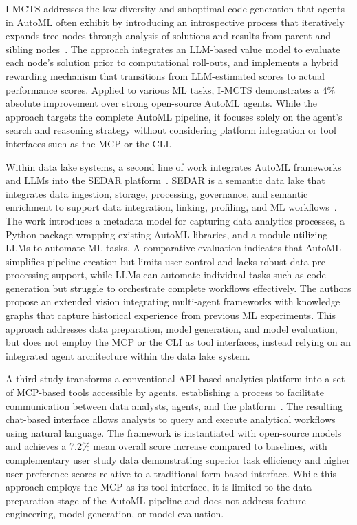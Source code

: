 \documentclass[
english,                 %
bibtex,                  %
includeExtraAbstracts, %
]{kththesis}
\numberwithin{listing}{chapter}
\begin{document}
\gls{I-MCTS} addresses the low-diversity and suboptimal code generation that agents in \gls{AutoML} often exhibit by introducing an introspective process that iteratively expands tree nodes through analysis of solutions and results from parent and sibling nodes~\cite{liang_i-mcts_2026}. The approach integrates an \gls{LLM}-based value model to evaluate each node's solution prior to computational roll-outs, and implements a hybrid rewarding mechanism that transitions from \gls{LLM}-estimated scores to actual performance scores. Applied to various \gls{ML} tasks, \gls{I-MCTS} demonstrates a 4\% absolute improvement over strong open-source \gls{AutoML} agents. While the approach targets the complete \gls{AutoML} pipeline, it focuses solely on the agent's search and reasoning strategy without considering platform integration or tool interfaces such as the \gls{MCP} or the \gls{CLI}.

Within data lake systems, a second line of work integrates \gls{AutoML} frameworks and \glspl{LLM} into the \gls{SEDAR} platform~\cite{hoseini_towards_2025}. \gls{SEDAR} is a semantic data lake that integrates data ingestion, storage, processing, governance, and semantic enrichment to support data integration, linking, profiling, and \gls{ML} workflows~\cite{hoseini_sedar_2023}.  The work introduces a metadata model for capturing data analytics processes, a Python package wrapping existing \gls{AutoML} libraries, and a module utilizing \glspl{LLM} to automate \gls{ML} tasks. A comparative evaluation indicates that \gls{AutoML} simplifies pipeline creation but limits user control and lacks robust data pre-processing support, while \glspl{LLM} can automate individual tasks such as code generation but struggle to orchestrate complete workflows effectively. The authors propose an extended vision integrating multi-agent frameworks with knowledge graphs that capture historical experience from previous \gls{ML} experiments. This approach addresses data preparation, model generation, and model evaluation, but does not employ the \gls{MCP} or the \gls{CLI} as tool interfaces, instead relying on an integrated agent architecture within the data lake system.

A third study transforms a conventional \gls{API}-based analytics platform into a set of \gls{MCP}-based tools accessible by agents, establishing a process to facilitate communication between data analysts, agents, and the platform~\cite{fikardos_generative_2026}. The resulting chat-based interface allows analysts to query and execute analytical workflows using natural language. The framework is instantiated with open-source models and achieves a 7.2\% mean overall score increase compared to baselines, with complementary user study data demonstrating superior task efficiency and higher user preference scores relative to a traditional form-based interface. While this approach employs the \gls{MCP} as its tool interface, it is limited to the data preparation stage of the \gls{AutoML} pipeline and does not address feature engineering, model generation, or model evaluation.
\end{document}

